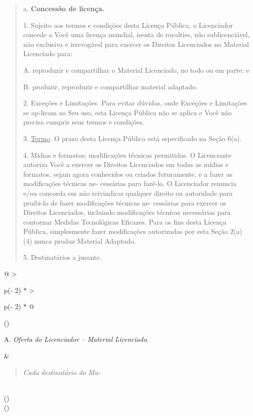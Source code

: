 \documentclass[
]{article}
\begin{document}
\begin{quote}
a. \textbf{Concessão de licença.}

1. Sujeito aos termos e condições desta Licença Pública, o Licenciador
concede a Você uma licença mundial, isenta de royalties, não
sublicenciável, não exclusiva e irrevogável para exercer os Direitos
Licenciados no Material Licenciado para:

A. reproduzir e compartilhar o Material Licenciado, no todo ou em parte;
e

B. produzir, reproduzir e compartilhar material adaptado.

2. Exceções e Limitações. Para evitar dúvidas, onde Exceções e
Limitações se ap-licam ao Seu uso, esta Licença Pública não se aplica e
Você não precisa cumprir seus termos e condições.

3. \uline{Termo}. O prazo desta Licença Pública está especificado na
Seção 6(a).

4. Mídias e formatos; modificações técnicas permitidas. O Licenciante
autoriza Você a exercer os Direitos Licenciados em todas as mídias e
formatos, sejam agora conhecidos ou criados futuramente, e a fazer as
modificações técnicas ne- cessárias para fazê-lo. O Licenciador renuncia
e/ou concorda em não reivindicar qualquer direito ou autoridade para
proibi-lo de fazer modificações técnicas ne- cessárias para exercer os
Direitos Licenciados, incluindo modificações técnicas necessárias para
contornar Medidas Tecnológicas Eficazes. Para os fins desta Licença
Pública, simplesmente fazer modificações autorizadas por esta Seção
2(a)(4) nunca produz Material Adaptado.

5. Destinatários a jusante.
\end{quote}

\begin{longtable}[]{@{}
  >{\raggedright\arraybackslash}p{(\columnwidth - 2\tabcolsep) * }
  >{\raggedright\arraybackslash}p{(\columnwidth - 2\tabcolsep) * }@{}}
\toprule()
\begin{minipage}[b]{\linewidth}\raggedright
A. \emph{Oferta do Licenciador -- Material Licenciado.}
\end{minipage} & \begin{minipage}[b]{\linewidth}\raggedright
\begin{quote}
\emph{Cada destinatário do Ma-}
\end{quote}
\end{minipage} \\
\midrule()
\endhead
{} \\
\bottomrule()
\end{longtable}
\end{document}
